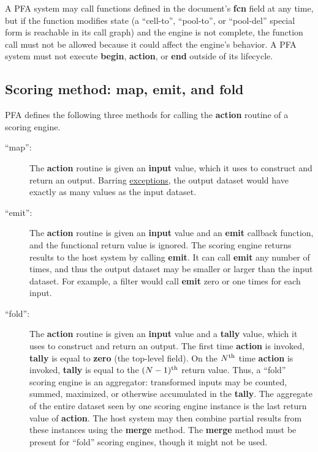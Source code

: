 \documentclass{article}
\newcommand{\PFAc}{\ttfamily\bfseries}
\newenvironment{allowedfields}%
  {\begin{center} \begin{minipage}{0.9\linewidth} \begin{description}}%
  {\end{description} \end{minipage} \end{center}}
\theoremstyle{definition}
\begin{document}
A PFA system may call functions defined in the document's {\PFAc fcn} field at any time, but if the function modifies state (a ``cell-to'', ``pool-to'', or ``pool-del'' special form is reachable in its call graph) and the engine is not complete, the function call must not be allowed because it could affect the engine's behavior.  A PFA system must not execute {\PFAc begin}, {\PFAc action}, or {\PFAc end} outside of its lifecycle.

\hypertarget{hsec:method}{}
\subsection{Scoring method: map, emit, and fold}
\label{sec:method}

PFA defines the following three methods for calling the {\PFAc action} routine of a scoring engine.
\begin{allowedfields}
\item[``map'':] The {\PFAc action} routine is given an {\PFAc input} value, which it uses to construct and return an output.  Barring \hyperlink{hsec:exceptions}{exceptions}, the output dataset would have exactly as many values as the input dataset.
\end{allowedfields}
\begin{allowedfields}
\item[``emit'':] The {\PFAc action} routine is given an {\PFAc input} value and an {\PFAc emit} callback function, and the functional return value is ignored.  The scoring engine returns results to the host system by calling {\PFAc emit}.  It can call {\PFAc emit} any number of times, and thus the output dataset may be smaller or larger than the input dataset.  For example, a filter would call {\PFAc emit} zero or one times for each input.
\end{allowedfields}
\begin{allowedfields}
\item[``fold'':] The {\PFAc action} routine is given an {\PFAc input} value and a {\PFAc tally} value, which it uses to construct and return an output.  The first time {\PFAc action} is invoked, {\PFAc tally} is equal to {\PFAc zero} (the top-level field).  On the $N^{\mbox{\scriptsize th}}$ time {\PFAc action} is invoked, {\PFAc tally} is equal to the $(N - 1)^{\mbox{\scriptsize th}}$ return value.  Thus, a ``fold'' scoring engine is an aggregator: transformed inputs may be counted, summed, maximized, or otherwise accumulated in the {\PFAc tally}.  The aggregate of the entire dataset seen by one scoring engine instance is the last return value of {\PFAc action}.  The host system may then combine partial results from these instances using the {\PFAc merge} method.  The {\PFAc merge} method must be present for ``fold'' scoring engines, though it might not be used.
\end{allowedfields}
\end{document}
